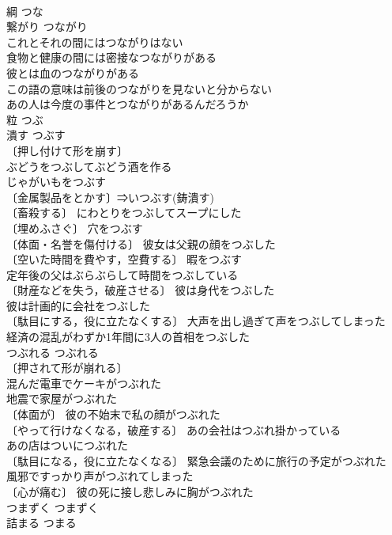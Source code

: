 \documentclass[8pt]{extreport}
\begin{document}
\begin{CJK}{UTF8}{min}
\\	綱	つな	
\\	繋がり	つながり	
\\	これとそれの間にはつながりはない 
\\	食物と健康の間には密接なつながりがある 
\\	彼とは血のつながりがある 
\\	この語の意味は前後のつながりを見ないと分からない 
\\	あの人は今度の事件とつながりがあるんだろうか 
\\	粒	つぶ	
\\	潰す	つぶす	
\\	〔押し付けて形を崩す〕
\\	ぶどうをつぶしてぶどう酒を作る 
\\	じゃがいもをつぶす 
\\	〔金属製品をとかす〕⇒いつぶす(鋳潰す) 
\\	〔畜殺する〕 にわとりをつぶしてスープにした 
\\	〔埋めふさぐ〕 穴をつぶす 
\\	〔体面・名誉を傷付ける〕 彼女は父親の顔をつぶした 
\\	〔空いた時間を費やす，空費する〕 暇をつぶす 
\\	定年後の父はぶらぶらして時間をつぶしている 
\\	〔財産などを失う，破産させる〕 彼は身代をつぶした 
\\	彼は計画的に会社をつぶした 
\\	〔駄目にする，役に立たなくする〕 大声を出し過ぎて声をつぶしてしまった 
\\	経済の混乱がわずか1年間に3人の首相をつぶした 
\\	つぶれる	つぶれる	
\\	〔押されて形が崩れる〕
\\	混んだ電車でケーキがつぶれた 
\\	地震で家屋がつぶれた 
\\	〔体面が〕 彼の不始末で私の顔がつぶれた 
\\	〔やって行けなくなる，破産する〕 あの会社はつぶれ掛かっている 
\\	あの店はついにつぶれた 
\\	〔駄目になる，役に立たなくなる〕 緊急会議のために旅行の予定がつぶれた 
\\	風邪ですっかり声がつぶれてしまった 
\\	〔心が痛む〕 彼の死に接し悲しみに胸がつぶれた 
\\	つまずく	つまずく	
\\	詰まる	つまる	

\end{CJK}
\end{document}
